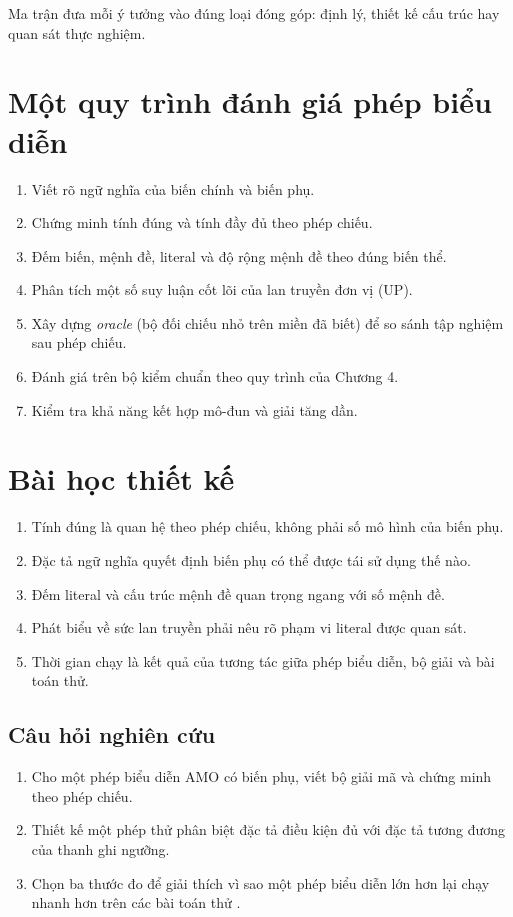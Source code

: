 Ma trận đưa mỗi ý tưởng vào đúng loại đóng góp: định lý, thiết kế cấu trúc hay
quan sát thực nghiệm.

\section{Một quy trình đánh giá phép biểu diễn}

\begin{summarybox}
\begin{enumerate}
  \item Viết rõ ngữ nghĩa của biến chính và biến phụ.
  \item Chứng minh tính đúng và tính đầy đủ theo phép chiếu.
  \item Đếm biến, mệnh đề, literal và độ rộng mệnh đề theo đúng biến thể.
  \item Phân tích một số suy luận cốt lõi của lan truyền đơn vị (UP).
  \item Xây dựng \emph{oracle} (bộ đối chiếu nhỏ trên miền đã biết) để so sánh
        tập nghiệm sau phép chiếu.
  \item Đánh giá trên bộ kiểm chuẩn theo quy trình của Chương 4.
  \item Kiểm tra khả năng kết hợp mô-đun và giải tăng dần.
\end{enumerate}
\end{summarybox}

\section{Bài học thiết kế}

\begin{enumerate}
  \item Tính đúng là quan hệ theo phép chiếu, không phải số mô hình của biến phụ.
  \item Đặc tả ngữ nghĩa quyết định biến phụ có thể được tái sử dụng thế nào.
  \item Đếm literal và cấu trúc mệnh đề quan trọng ngang với số mệnh đề.
  \item Phát biểu về sức lan truyền phải nêu rõ phạm vi literal được quan sát.
  \item Thời gian chạy là kết quả của tương tác giữa phép biểu diễn, bộ giải và bài toán thử.
\end{enumerate}

\subsection*{Câu hỏi nghiên cứu}
\begin{enumerate}
  \item Cho một phép biểu diễn AMO có biến phụ, viết bộ giải mã và chứng
        minh theo phép chiếu.
  \item Thiết kế một phép thử phân biệt đặc tả điều kiện đủ với đặc tả tương
        đương của thanh ghi ngưỡng.
  \item Chọn ba thước đo để giải thích vì sao một phép biểu diễn lớn hơn lại chạy
        nhanh hơn trên các bài toán thử \UNSAT.
\end{enumerate}
